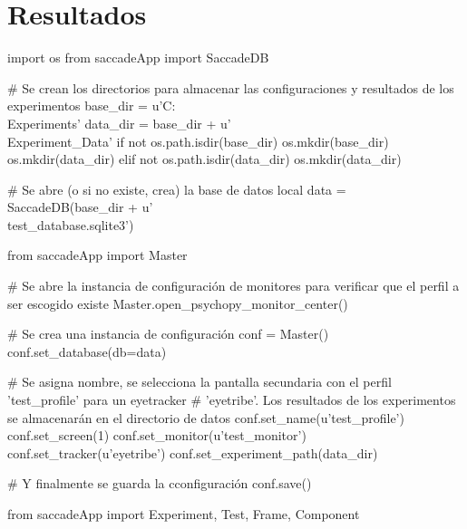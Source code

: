 \documentclass[\main/main.tex]{subfiles}
\begin{document}
\chapter{Resultados}
\label{cha:04_resultados}
	
	


	\begin{python}[caption=Crear la carpeta del experimento y la base de datos., captionpos=b, label=alg:04_new_db]
	import os
	from saccadeApp import SaccadeDB

	# Se crean los directorios para almacenar las configuraciones y resultados de los experimentos
	base_dir = u'C:\\Experiments'
	data_dir = base_dir + u'\\Experiment_Data'
	if not os.path.isdir(base_dir)
		os.mkdir(base_dir)
		os.mkdir(data_dir)
	elif not os.path.isdir(data_dir)
		os.mkdir(data_dir)

	# Se abre (o si no existe, crea) la base de datos local
	data = SaccadeDB(base_dir + u'\\test_database.sqlite3')

	\end{python}


	\begin{python}[caption=Crear un nuevo perfil de configuración., captionpos=b, label=alg:04_new_conf]
	from saccadeApp import Master

	# Se abre la instancia de configuración de monitores para verificar que el perfil a ser escogido existe 
	Master.open_psychopy_monitor_center()

	# Se crea una instancia de configuración
	conf = Master()
	conf.set_database(db=data)

	# Se asigna nombre, se selecciona la pantalla secundaria con el perfil 'test_profile' para un eyetracker
	# 'eyetribe'. Los resultados de los experimentos se almacenarán en el directorio de datos
	conf.set_name(u'test_profile')
	conf.set_screen(1)
	conf.set_monitor(u'test_monitor')
	conf.set_tracker(u'eyetribe')
	conf.set_experiment_path(data_dir)

	# Y finalmente se guarda la cconfiguración
	conf.save()

	\end{python}


	\begin{python}[caption=Crear un nuevo experimento., captionpos=b, label=alg:04_new_exp]
	from saccadeApp import Experiment, Test, Frame, Component

	

	

	\end{python}
\end{document}
